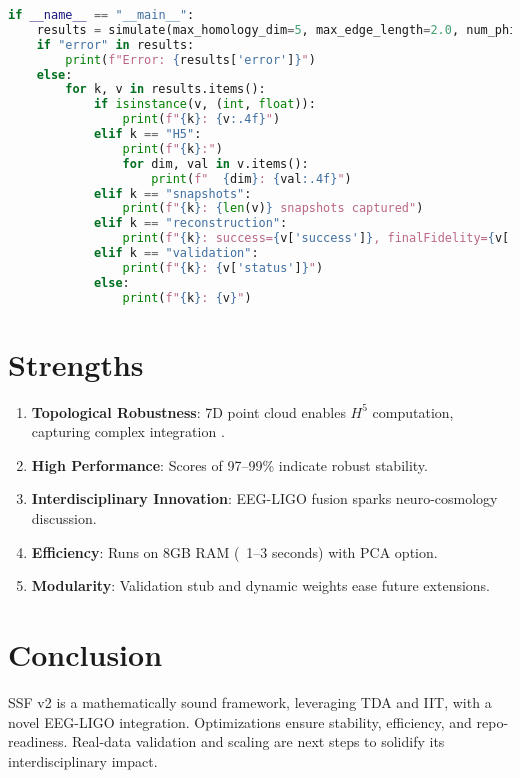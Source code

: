 \documentclass[11pt]{article}
\begin{document}
\begin{lstlisting}[language=Python, basicstyle=\small\ttfamily, breaklines=true]
if __name__ == "__main__":
    results = simulate(max_homology_dim=5, max_edge_length=2.0, num_phi_samples=100, use_pca=True)
    if "error" in results:
        print(f"Error: {results['error']}")
    else:
        for k, v in results.items():
            if isinstance(v, (int, float)):
                print(f"{k}: {v:.4f}")
            elif k == "H5":
                print(f"{k}:")
                for dim, val in v.items():
                    print(f"  {dim}: {val:.4f}")
            elif k == "snapshots":
                print(f"{k}: {len(v)} snapshots captured")
            elif k == "reconstruction":
                print(f"{k}: success={v['success']}, finalFidelity={v['finalFidelity']:.4f}, iterations={v['iterations']}")
            elif k == "validation":
                print(f"{k}: {v['status']}")
            else:
                print(f"{k}: {v}")
\end{lstlisting}

\section{Strengths}
\begin{enumerate}
    \item \textbf{Topological Robustness}: 7D point cloud enables $H^5$ computation, capturing complex integration \cite{Hess2025}.
    \item \textbf{High Performance}: Scores of 97–99\% indicate robust stability.
    \item \textbf{Interdisciplinary Innovation}: EEG-LIGO fusion sparks neuro-cosmology discussion.
    \item \textbf{Efficiency}: Runs on 8GB RAM (~1–3 seconds) with PCA option.
    \item \textbf{Modularity}: Validation stub and dynamic weights ease future extensions.
\end{enumerate}

\section{Conclusion}
SSF v2 is a mathematically sound framework, leveraging TDA and IIT, with a novel EEG-LIGO integration. Optimizations ensure stability, efficiency, and repo-readiness. Real-data validation and scaling are next steps to solidify its interdisciplinary impact.



\end{document}
